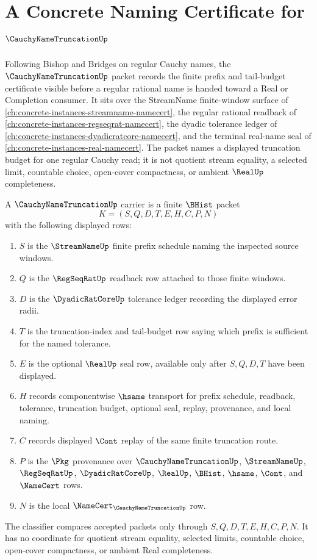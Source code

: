 \chapter{A Concrete Naming Certificate for $\CauchyNameTruncationUp$}
\label{ch:concrete-instances-cauchy-name-truncation-namecert}

Following Bishop and Bridges on regular Cauchy names, the $\CauchyNameTruncationUp$ packet records the finite prefix and tail-budget certificate visible before a regular rational name is handed toward a Real or Completion consumer. It sits over the StreamName finite-window surface of \autoref{ch:concrete-instances-streamname-namecert}, the regular rational readback of \autoref{ch:concrete-instances-regseqrat-namecert}, the dyadic tolerance ledger of \autoref{ch:concrete-instances-dyadicratcore-namecert}, and the terminal real-name seal of \autoref{ch:concrete-instances-real-namecert}. The packet names a displayed truncation budget for one regular Cauchy read; it is not quotient stream equality, a selected limit, countable choice, open-cover compactness, or ambient $\RealUp$ completeness.

\begin{definition}
\label{def:cauchy-name-truncation-carrier}
A $\CauchyNameTruncationUp$ carrier is a finite $\BHist$ packet
$$
K=(S,Q,D,T,E,H,C,P,N)
$$
with the following displayed rows:
\begin{enumerate}
\item $S$ is the $\StreamNameUp$ finite prefix schedule naming the inspected source windows.
\item $Q$ is the $\RegSeqRatUp$ readback row attached to those finite windows.
\item $D$ is the $\DyadicRatCoreUp$ tolerance ledger recording the displayed error radii.
\item $T$ is the truncation-index and tail-budget row saying which prefix is sufficient for the named tolerance.
\item $E$ is the optional $\RealUp$ seal row, available only after $S,Q,D,T$ have been displayed.
\item $H$ records componentwise $\hsame$ transport for prefix schedule, readback, tolerance, truncation budget, optional seal, replay, provenance, and local naming.
\item $C$ records displayed $\Cont$ replay of the same finite truncation route.
\item $P$ is the $\Pkg$ provenance over $\CauchyNameTruncationUp$, $\StreamNameUp$, $\RegSeqRatUp$, $\DyadicRatCoreUp$, $\RealUp$, $\BHist$, $\hsame$, $\Cont$, and $\NameCert$ rows.
\item $N$ is the local $\NameCert_{\CauchyNameTruncationUp}$ row.
\end{enumerate}
The classifier compares accepted packets only through $S,Q,D,T,E,H,C,P,N$. It has no coordinate for quotient stream equality, selected limits, countable choice, open-cover compactness, or ambient Real completeness.
\end{definition}

